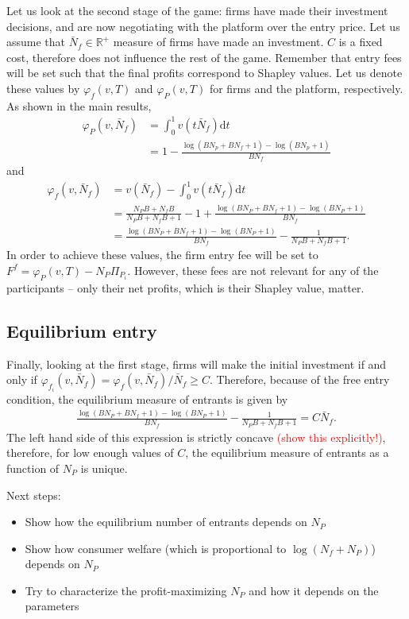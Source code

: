\documentclass[a4paper]{article}
\newcommand{\dt}{\mathrm{d}t}
\begin{document}
Let us look at the second stage of the game: firms have made their investment decisions, and are now negotiating with the platform over the entry price. Let us assume that $\bar{N}_f \in \mathbb{R}^+$ measure of firms have made an investment. $C$ is a fixed cost, therefore does not influence the rest of the game. Remember that entry fees will be set such that the final profits correspond to Shapley values. Let us denote these values by $\varphi_f(v, T)$ and $\varphi_P(v, T)$ for firms and the platform, respectively. As shown in the main results,
\begin{align*}
    \varphi_P(v, \bar{N}_f) &= \int_0^1 v(t \bar{N}_f) \dt \\
    &= 1 - \frac{\log(BN_p + BN_f + 1) - \log(BN_p + 1)}{BN_f}
\end{align*}
and
\begin{align*}
    \varphi_f(v, \bar{N}_f) &= v(\bar{N}_f) - \int_0^1 v(t \bar{N}_f) \dt \\
    &= \frac{N_P B + N_f B}{N_P B + N_f B + 1} - 1 + \frac{\log(BN_P + BN_f + 1) - \log(BN_P + 1)}{BN_f} \\
    &= \frac{\log(BN_P + BN_f + 1) - \log(BN_P + 1)}{BN_f} - \frac{1}{N_P B + N_f B + 1}.
\end{align*}
In order to achieve these values, the firm entry fee will be set to $F^f = \varphi_P(v, T) - N_P\Pi_{P_i}$. However, these fees are not relevant for any of the participants -- only their net profits, which is their Shapley value, matter.

\subsection{Equilibrium entry}

Finally, looking at the first stage, firms will make the initial investment if and only if $\varphi_{f_i}(v, \bar{N}_f) = \varphi_f(v, \bar{N}_f) / \bar{N}_f \geq C$. Therefore, because of the free entry condition, the equilibrium measure of entrants is given by
\begin{align*}
    \frac{\log(BN_P + BN_f + 1) - \log(BN_P + 1)}{BN_f} - \frac{1}{N_P B + N_f B + 1} = C \bar{N}_f.
\end{align*}
The left hand side of this expression is strictly concave \textcolor{red}{(show this explicitly!)}, therefore, for low enough values of $C$, the equilibrium measure of entrants as a function of $N_P$ is unique.

Next steps:
\begin{itemize}
    \item Show how the equilibrium number of entrants depends on $N_P$
    \item Show how consumer welfare (which is proportional to $\log(N_f + N_P)$) depends on $N_P$
    \item Try to characterize the profit-maximizing $N_P$ and how it depends on the parameters
\end{itemize}
\end{document}
